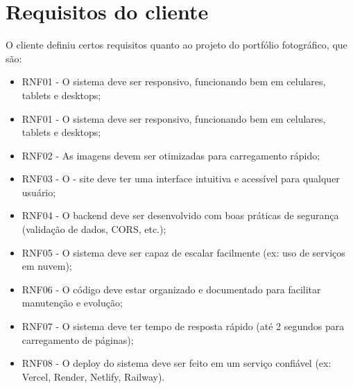 \section{Requisitos do cliente}
 O cliente definiu certos requisitos quanto ao projeto do portfólio fotográfico, que são:
 \begin{itemize}
    \item RNF01 - O sistema deve ser responsivo, funcionando bem em celulares, tablets e desktops;
    \item RNF01 - O sistema deve ser responsivo, funcionando bem em celulares, tablets e desktops;
    \item RNF02 - As imagens devem ser otimizadas para carregamento rápido;
    \item RNF03 - O - site deve ter uma interface intuitiva e acessível para qualquer usuário;
    \item RNF04 - O backend deve ser desenvolvido com boas práticas de segurança (validação de dados, CORS, etc.);
    \item RNF05 - O sistema deve ser capaz de escalar facilmente (ex: uso de serviços em nuvem);
    \item RNF06 - O código deve estar organizado e documentado para facilitar manutenção e evolução;
    \item RNF07 - O sistema deve ter tempo de resposta rápido (até 2 segundos para carregamento de páginas);
    \item RNF08 - O deploy do sistema deve ser feito em um serviço confiável (ex: Vercel, Render, Netlify, Railway).
    















































































\end{itemize}
